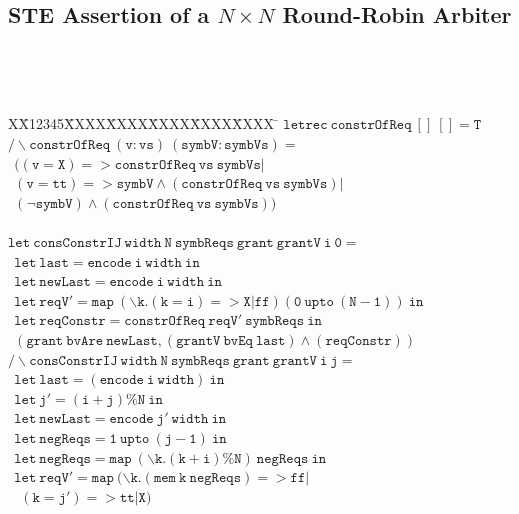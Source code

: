 \documentclass[final]{IEEEtran}
\newlength{\fminilength}
\newenvironment{fmini}[1][\linewidth]
  {\setlength{\fminilength}{#1\fboxsep-2\fboxrule}%
   \vspace{2ex}\noindent\begin{lrbox}{\fminibox}\begin{minipage}{\fminilength}%
   \mbox{ }\hfill\vspace{-2.5ex}}%
  {\end{minipage}\end{lrbox}\vspace{1ex}\hspace{0ex}%
   \framebox{\usebox{\fminibox}}}
\newenvironment{specification}
{\noindent\footnotesize\tt\begin{fmini}\begin{tabbing}X\=X12345\=XXXX\=XXXX\=XXXX\=XXXX\=XXXX
\=\+\kill} {\end{tabbing}\normalfont\end{fmini}}
\begin{document}
\subsection{STE Assertion of a $N \times N$ Round-Robin Arbiter }
\begin{table}
\caption{STE Assertion of a $N \times N$ Round-Robin Arbiter }

\label{table:STEAssertion}
\begin{specification}
$\mathtt{letrec\ constrOfReq\ []\ []=T}$\\
 $\mathtt{/\backslash    constrOfReq\ (v:vs)\ (symbV:symbVs)
 =}$\\
     $\mathtt{\ \        ( (v=X) => constrOfReq\ vs\ symbVs|}$\\
      $\mathtt{\ \      (v=tt) =>symbV \wedge  ( constrOfReq\ vs\  symbVs)
      |}$\\
          $\mathtt{\ \     (\neg symbV)\wedge  ( constrOfReq\ vs\
          symbVs)})$\\

\\

$\mathtt{let\ consConstrIJ\  width\ N\ symbReqs\ grant\
grantV\ i\ 0=}$\\
 $\mathtt{\ \     let\ last=encode\ i\ width\ in}$\\
   $\mathtt{\ \   let\ newLast=encode\ i\ width\ in}$\\
   $\mathtt{\ \   let\ reqV'=map\ (\backslash k. (k=i)=> X |  ff) (0\ upto\ (N -
   1))\
   in}$\\
   $\mathtt{\ \   let\ reqConstr=constrOfReq\ reqV'\ symbReqs\
   in}$\\
   $\mathtt{\ \   (grant\ bvAre\ newLast,      (grantV\ bvEq\ last)
   \wedge
   (reqConstr))}$\\


$\mathtt{/\backslash consConstrIJ\ width\ N\ symbReqs\  grant\
grantV\ i\ j =}$\\
  $\mathtt{\ \    let\ last=(encode\ i\ width)\ in}$\\
  $\mathtt{\ \    let\ j'=(i +j )\%N\ in}$\\
 $\mathtt{\ \     let\ newLast=encode\ j'\ width\ in}$\\
 $\mathtt{ \ \    let\ negReqs=1 \ upto\ (j - 1)\ in}$\\
  $\mathtt{ \ \     let\  negReqs=map\ (\backslash k.  ( k + i) \% N) \ negReqs\
  in}$\\

   $\mathtt{\ \     let\  reqV'=map\ (\backslash k. (mem\ k\ negReqs)=>
   ff|}$\\
   $\mathtt{\ \  \ \  (k= j')  => tt |X) }$\\


\end{specification}
\end{table}
\end{document}
